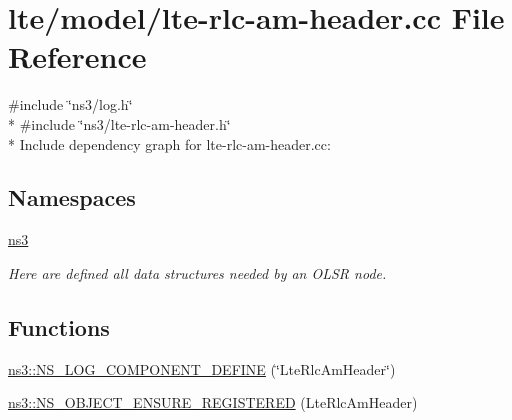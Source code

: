 \hypertarget{lte-rlc-am-header_8cc}{}\section{lte/model/lte-\/rlc-\/am-\/header.cc File Reference}
\label{lte-rlc-am-header_8cc}
{\ttfamily \#include \char`\"{}ns3/log.\+h\char`\"{}}\\*
{\ttfamily \#include \char`\"{}ns3/lte-\/rlc-\/am-\/header.\+h\char`\"{}}\\*
Include dependency graph for lte-\/rlc-\/am-\/header.cc\+:
\subsection*{Namespaces}
\begin{DoxyCompactItemize}
\item 
 \hyperlink{namespacens3}{ns3}
\begin{DoxyCompactList}\small\item\em Here are defined all data structures needed by an O\+L\+SR node. \end{DoxyCompactList}\end{DoxyCompactItemize}
\subsection*{Functions}
\begin{DoxyCompactItemize}
\item 
\hyperlink{namespacens3_a589382b6130ec8f678fe6463ca066404}{ns3\+::\+N\+S\+\_\+\+L\+O\+G\+\_\+\+C\+O\+M\+P\+O\+N\+E\+N\+T\+\_\+\+D\+E\+F\+I\+NE} (\char`\"{}Lte\+Rlc\+Am\+Header\char`\"{})
\item 
\hyperlink{namespacens3_a4e0f21ee2f6be2482ac3a4a88fa99939}{ns3\+::\+N\+S\+\_\+\+O\+B\+J\+E\+C\+T\+\_\+\+E\+N\+S\+U\+R\+E\+\_\+\+R\+E\+G\+I\+S\+T\+E\+R\+ED} (Lte\+Rlc\+Am\+Header)
\end{DoxyCompactItemize}
